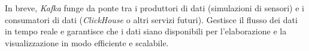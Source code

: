 In breve, \textit{Kafka} funge da ponte tra i produttori di dati (simulazioni di sensori) e i consumatori di dati (\textit{ClickHouse} o altri servizi futuri). Gestisce il flusso dei dati in tempo reale e garantisce che i dati siano disponibili per l'elaborazione e la visualizzazione in modo efficiente e scalabile.